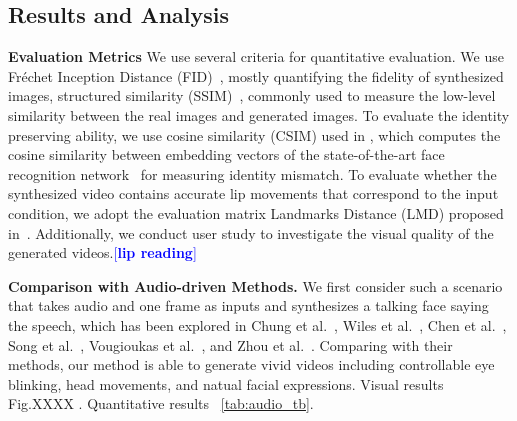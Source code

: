 \documentclass[runningheads]{llncs}
\providecommand{\lchen}[1]{\textcolor{blue}{[{\bf #1}]}}
\begin{document}
\subsection{Results and Analysis}
\label{subsec:quanti_res}
\noindent \textbf{Evaluation Metrics} \quad We use several criteria for quantitative evaluation. We use Fréchet Inception Distance (FID)~\cite{heusel2017gans}, mostly quantifying the fidelity of synthesized images, structured similarity (SSIM)~\cite{wang2004image}, commonly used to measure the low-level similarity between the real images and generated images. To evaluate the identity preserving ability, we use cosine similarity ({{CSIM}}) used in \cite{zakharov2019few}, which computes the cosine similarity between embedding vectors of the state-of-the-art face recognition network~\cite{deng2019arcface} for measuring identity mismatch. To evaluate whether the synthesized video contains accurate lip movements that correspond to the input condition, we adopt the evaluation matrix Landmarks Distance (LMD) proposed in~\cite{chen2018lip}. Additionally, we conduct user study to investigate the visual quality of the generated videos.{\lchen{lip reading}}




\noindent \textbf{Comparison with Audio-driven Methods.} \quad We first consider such a scenario that takes audio and one frame as inputs and synthesizes a talking face saying the speech, which has been explored in Chung et al.~\cite{chung2017you}, Wiles et al.~\cite{wiles2018x2face}, Chen et al.~\cite{chen2019hierarchical}, Song et al.~\cite{ijcai2019-129}, Vougioukas et al.~\cite{vougioukas2019realistic}, and Zhou et al.~\cite{zhou2019talking}. Comparing  with their methods, our method is able to generate vivid videos including controllable eye blinking, head movements, and natual facial expressions. Visual results Fig.XXXX . Quantitative results  ~\ref{tab:audio_tb}.
\end{document}
